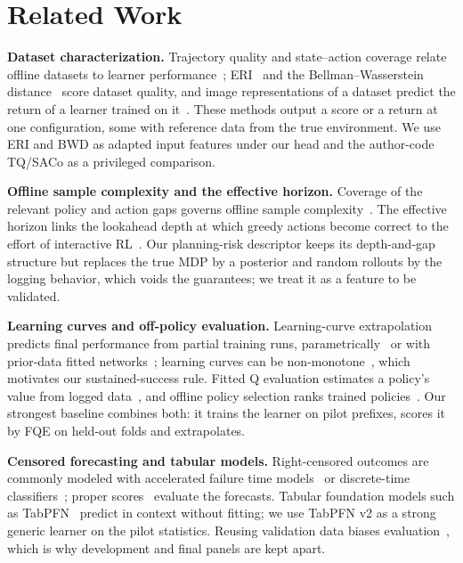 \section{Related Work}
\label{sec:related}

\textbf{Dataset characterization.} Trajectory quality and state--action coverage relate offline datasets to learner performance~\cite{schweighofer2022dataset}; ERI~\cite{swazinna2021quality} and the Bellman--Wasserstein distance~\cite{asadulaev2026bwd} score dataset quality, and image representations of a dataset predict the return of a learner trained on it~\cite{mateos2024images}. These methods output a score or a return at one configuration, some with reference data from the true environment. We use ERI and BWD as adapted input features under our head and the author-code TQ/SACo as a privileged comparison.

\textbf{Offline sample complexity and the effective horizon.} Coverage of the relevant policy and action gaps governs offline sample complexity~\cite{rashidinejad2021bridging,li2024sample,wang2022gapoffline}. The effective horizon links the lookahead depth at which greedy actions become correct to the effort of interactive RL~\cite{laidlaw2023effective,laidlaw2024stochastic}. Our planning-risk descriptor keeps its depth-and-gap structure but replaces the true MDP by a posterior and random rollouts by the logging behavior, which voids the guarantees; we treat it as a feature to be validated.

\textbf{Learning curves and off-policy evaluation.} Learning-curve extrapolation predicts final performance from partial training runs, parametrically~\cite{domhan2015speeding} or with prior-data fitted networks~\cite{adriaensen2023efficient}; learning curves can be non-monotone~\cite{viering2023shape}, which motivates our sustained-success rule. Fitted Q evaluation estimates a policy's value from logged data~\cite{le2019batch,voloshin2021empirical}, and offline policy selection ranks trained policies~\cite{yang2022selection,tang2021selection}. Our strongest baseline combines both: it trains the learner on pilot prefixes, scores it by FQE on held-out folds and extrapolates.

\textbf{Censored forecasting and tabular models.} Right-censored outcomes are commonly modeled with accelerated failure time models~\cite{barnwal2022aft} or discrete-time classifiers~\cite{kim2026survival}; proper scores~\cite{gneiting2007strictly} evaluate the forecasts. Tabular foundation models such as TabPFN~\cite{hollmann2025accurate} predict in context without fitting; we use TabPFN v2 as a strong generic learner on the pilot statistics. Reusing validation data biases evaluation~\cite{cawley2010selection,dwork2015adaptive}, which is why development and final panels are kept apart.
